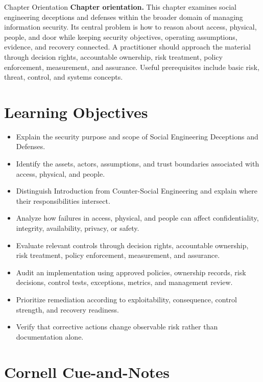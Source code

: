 \documentclass[11pt,letterpaper]{article}
\title{\CornellDocumentTitle}
\author{}
\date{}
\begin{document}
\maketitle
\begin{CornellOverviewBox}{Chapter Orientation}
\textbf{Chapter orientation.} This chapter examines social engineering deceptions and defenses within the broader domain of managing information security. Its central problem is how to reason about access, physical, people, and door while keeping security objectives, operating assumptions, evidence, and recovery connected. A practitioner should approach the material through decision rights, accountable ownership, risk treatment, policy enforcement, measurement, and assurance. Useful prerequisites include basic risk, threat, control, and systems concepts.
\end{CornellOverviewBox}
\section*{Learning Objectives}
\begin{itemize}
\item Explain the security purpose and scope of Social Engineering Deceptions and Defenses.
\item Identify the assets, actors, assumptions, and trust boundaries associated with access, physical, and people.
\item Distinguish Introduction from Counter-Social Engineering and explain where their responsibilities intersect.
\item Analyze how failures in access, physical, and people can affect confidentiality, integrity, availability, privacy, or safety.
\item Evaluate relevant controls through decision rights, accountable ownership, risk treatment, policy enforcement, measurement, and assurance.
\item Audit an implementation using approved policies, ownership records, risk decisions, control tests, exceptions, metrics, and management review.
\item Prioritize remediation according to exploitability, consequence, control strength, and recovery readiness.
\item Verify that corrective actions change observable risk rather than documentation alone.
\end{itemize}
\section*{Cornell Cue-and-Notes}
\end{document}
